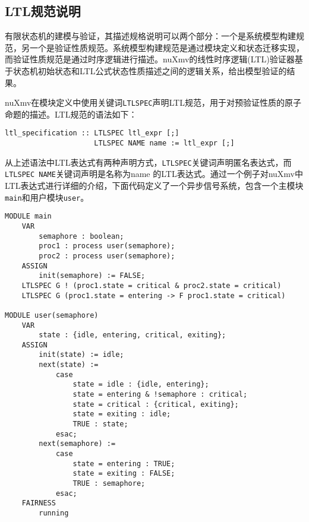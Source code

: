 \subsection{LTL规范说明}
有限状态机的建模与验证，其描述规格说明可以两个部分：一个是系统模型构建规范，另一个是验证性质规范。系统模型构建规范是通过模块定义和状态迁移实现，而验证性质规范是通过时序逻辑进行描述。nuXmv的线性时序逻辑(LTL)验证器基于状态机初始状态和LTL公式状态性质描述之间的逻辑关系，给出模型验证的结果。

nuXmv在模块定义中使用关键词\verb|LTLSPEC|声明LTL规范，用于对预验证性质的原子命题的描述。LTL规范的语法如下：

\begin{lstlisting}
ltl_specification :: LTLSPEC ltl_expr [;]
                     LTLSPEC NAME name := ltl_expr [;]
\end{lstlisting}

从上述语法中LTL表达式有两种声明方式，\verb|LTLSPEC|关键词声明匿名表达式，而\verb|LTLSPEC NAME|关键词声明是名称为name 的LTL表达式。通过一个例子对nuXmv中LTL表达式进行详细的介绍，下面代码定义了一个异步信号系统，包含一个主模块\verb|main|和用户模块\verb|user|。

\begin{lstlisting}
MODULE main
    VAR
        semaphore : boolean;
        proc1 : process user(semaphore);
        proc2 : process user(semaphore);
    ASSIGN
        init(semaphore) := FALSE;
    LTLSPEC G ! (proc1.state = critical & proc2.state = critical)
    LTLSPEC G (proc1.state = entering -> F proc1.state = critical)

MODULE user(semaphore)
    VAR
        state : {idle, entering, critical, exiting};
    ASSIGN
        init(state) := idle;
        next(state) :=
            case
                state = idle : {idle, entering};
                state = entering & !semaphore : critical;
                state = critical : {critical, exiting};
                state = exiting : idle;
                TRUE : state;
            esac;
        next(semaphore) :=
            case
                state = entering : TRUE;
                state = exiting : FALSE;
                TRUE : semaphore;
            esac;
    FAIRNESS
        running
\end{lstlisting}

